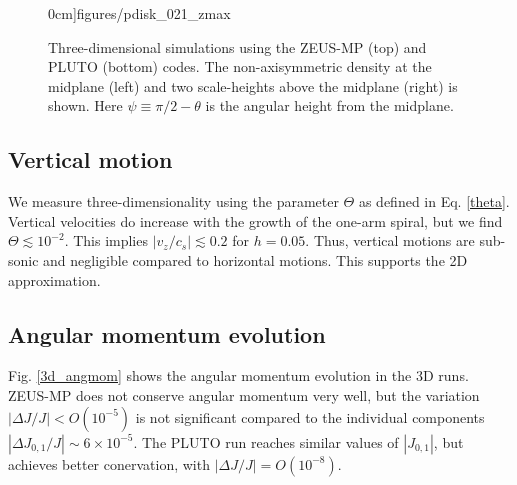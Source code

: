 \begin{figure}
\begin{center}
{      0cm]{figures/pdisk_021_zmax}
    }
  \end{center}
  \caption{Three-dimensional simulations using the ZEUS-MP (top) and 
    PLUTO (bottom) codes. The non-axisymmetric density at the midplane (left) and
    two scale-heights above the midplane (right) is shown. Here $\psi
    \equiv \pi/2 - \theta$ is the angular height  
    from the midplane.\label{3d_prelim}}   
\end{figure}

\subsection{Vertical motion}
We measure three-dimensionality using the parameter $\Theta$ as
defined in Eq. \ref{theta}.  Vertical velocities
do increase with the growth of the one-arm spiral, 
but we find  $\Theta \lesssim 10^{-2}$. This implies $|v_z/c_s|\lesssim
0.2$ for $h=0.05$. Thus, vertical motions are sub-sonic and negligible
compared to horizontal motions. This supports the 2D approximation. 

\subsection{Angular momentum evolution}

Fig. \ref{3d_angmom} shows the angular momentum evolution in the 3D
runs. ZEUS-MP does not conserve angular momentum very well, but
the variation $|\Delta J/J|< O(10^{-5})$ is not significant compared
to the individual components $|\Delta J_{0,1}/J|\sim 
6\times10^{-5}$. The PLUTO run reaches similar values of
$|J_{0,1}|$, but achieves better conervation, with $|\Delta
J/J|=O(10^{-8})$. 

